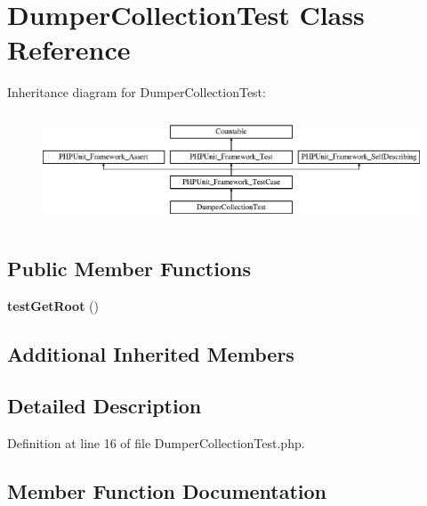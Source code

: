 \section{Dumper\+Collection\+Test Class Reference}
\label{class_symfony_1_1_component_1_1_routing_1_1_tests_1_1_matcher_1_1_dumper_1_1_dumper_collection_test}
Inheritance diagram for Dumper\+Collection\+Test\+:\begin{figure}[H]
\begin{center}
\leavevmode
\includegraphics[height=3.303835cm]{class_symfony_1_1_component_1_1_routing_1_1_tests_1_1_matcher_1_1_dumper_1_1_dumper_collection_test}
\end{center}
\end{figure}
\subsection*{Public Member Functions}
\begin{DoxyCompactItemize}
\item 
{\bf test\+Get\+Root} ()
\end{DoxyCompactItemize}
\subsection*{Additional Inherited Members}


\subsection{Detailed Description}


Definition at line 16 of file Dumper\+Collection\+Test.\+php.



\subsection{Member Function Documentation}
